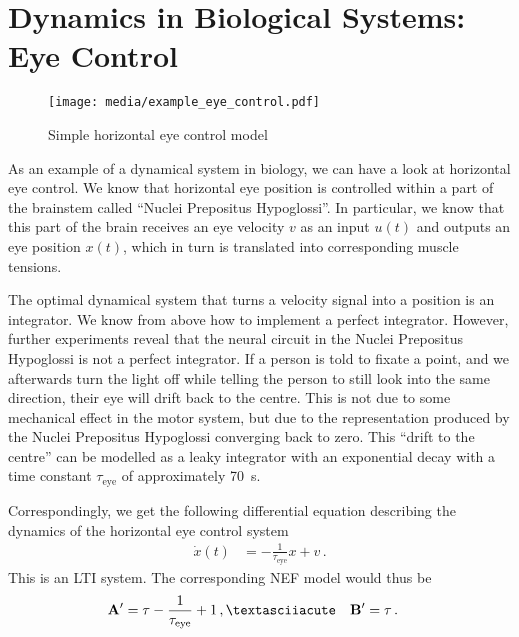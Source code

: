 \documentclass[10pt,letterpaper,oneside]{article}
\begin{document}
\section{Dynamics in Biological Systems: Eye Control}

\begin{figure}
	\centering
	\texttt{[image: media/example\_eye\_control.pdf]}
	\caption{Simple horizontal eye control model}
\end{figure}

As an example of a dynamical system in biology, we can have a look at horizontal eye control. We know that horizontal eye position is controlled within a part of the brainstem called \enquote{Nuclei Prepositus Hypoglossi}. In particular, we know that this part of the brain receives an eye velocity $v$ as an input $u(t)$ and outputs an eye position $x(t)$, which in turn is translated into corresponding muscle tensions.

The optimal dynamical system that turns a velocity signal into a position is an integrator. We know from above how to implement a perfect integrator. However, further experiments reveal that the neural circuit in the Nuclei Prepositus Hypoglossi is not a perfect integrator. If a person is told to fixate a point, and we afterwards turn the light off while telling the person to still look into the same direction, their eye will drift back to the centre. This is not due to some mechanical effect in the motor system, but due to the representation produced by the Nuclei Prepositus Hypoglossi converging back to zero. This \enquote{drift to the centre} can be modelled as a leaky integrator with an exponential decay with a time constant $\tau_\mathrm{eye}$ of approximately \SI{70}{\second}.

Correspondingly, we get the following differential equation describing the dynamics of the horizontal eye control system
\begin{align*}
	\dot x(t) &= - \frac{1}{\tau_\mathrm{eye}} x + v \,.
\end{align*}
This is an LTI system. The corresponding NEF model would thus be
\begin{align*}
	\mat A' &= \tau - \frac{1}{\tau_\mathrm{eye}} + 1 \,,´&
	\mat B' &= \tau \,.
\end{align*}

\printbibliography
\end{document}
